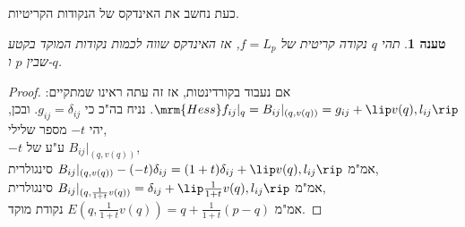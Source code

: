 \documentclass{article}
\newtheorem*{claim*}{טענה}
\theoremstyle{definition}
\begin{document}
	כעת נחשב את האינדקס של הנקודות הקריטיות.
	\begin{claim*}
		תהי
		\(q\)
		נקודה קריטית של
		\(f=L_p\),
		אז האינדקס שווה לכמות נקודות המוקד בקטע שבין \(p\) ו-\(q\).
	\end{claim*}
	\begin{proof}
		אם נעבוד בקורדינטות, אז זה עתה ראינו שמתקיים:
		\(
			\mrm{Hess}f_{ij}|_q
			= B_{ij}|_{(q,v(q))}
			= g_{ij} + \lip v(q),l_{ij} \rip
		\).
		נניח בה"כ כי
		\(g_{ij}=\delta_{ij}\).
		ובכן, יהי
		\(-t\)
		מספר שלילי,
		\\
		\(-t\)
		ע"ע של
		\(B_{ij}|_{(q,v(q))}\),
		\\
		אמ"מ
		\(B_{ij}|_{(q,v(q))}-(-t)\delta_{ij} = (1+t)\delta_{ij} + \lip v(q),l_{ij} \rip\)
		סינגולרית,
		\\
		אמ"מ
		\(B_{ij}|_{(q,\frac{1}{1+t}v(q))}=\delta_{ij} + \lip \frac{1}{1+t}v(q),l_{ij} \rip\)
		סינגולרית,
		\\
		אמ"מ
		\(E\left(q,\frac{1}{1+t}v(q)\right) = q + \frac{1}{1+t} (p-q)\)
		נקודת מוקד.
	\end{proof}
	
\end{document}
